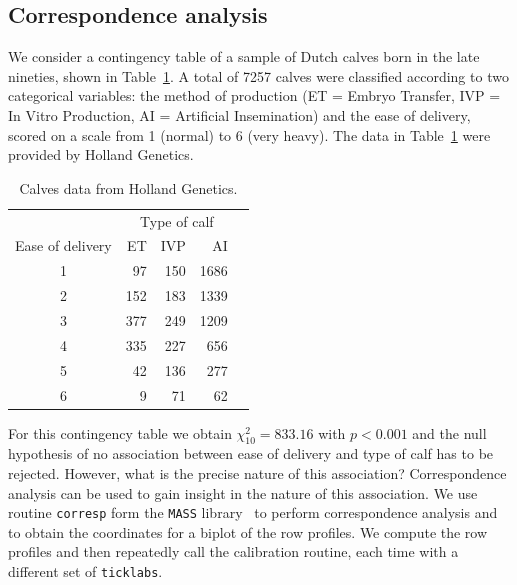 \documentclass[a4paper]{article}
\begin{document}
\subsection{Correspondence analysis}
\label{sec:ca}

We consider a contingency table of a sample of Dutch calves born in the late nineties,
shown in Table~\ref{tab:calves2}. A total of 7257 calves were classified according 
to two categorical variables: the
method of production (ET = Embryo Transfer, IVP = In Vitro Production, AI = Artificial
Insemination) and the ease of delivery, scored on a scale from 1 (normal) to 6 (very heavy).
The data in Table~\ref{tab:calves2} were provided by Holland Genetics.
\begin{table}[htb]
\centering
\begin{tabular}{c|rrrr}
 & \multicolumn{3}{c}{Type of calf}\\
Ease of delivery  & ET & IVP & AI\\
\hline
1 &  97 & 150 & 1686\\
2 & 152 & 183 & 1339\\
3 & 377 & 249 & 1209\\
4 & 335 & 227 &  656\\
5 &  42 & 136 &  277\\
6 &   9 &  71 &   62\\
\hline
\end{tabular}
\caption{Calves data from Holland Genetics.}
\label{tab:calves2}
\end{table}

For this contingency table we obtain $\chi^2_{10} = 833.16$ with $p < 0.001$ and the null
hypothesis of no association between ease of delivery and type of calf has to be rejected. However, what is
the precise nature of this association? Correspondence analysis can be used to gain insight in the 
nature of this association. We use routine {\tt corresp} form the {\tt MASS} library~\cite{Venables}
to perform correspondence analysis and to obtain the coordinates for a biplot of the row profiles.
We compute the row profiles and then repeatedly call the calibration routine, each time with a
different set of {\tt ticklabs}.
\end{document}
